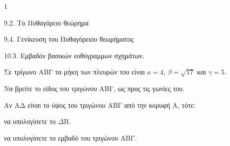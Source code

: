 \begin{ylh}{1}
    \item 9.2. Το Πυθαγόρειο θεώρημα
    \item 9.4. Γενίκευση του Πυθαγόρειου θεωρήματος
    \item 10.3. Εμβαδόν βασικών ευθύγραμμων σχημάτων.
\end{ylh}
Σε τρίγωνο ΑΒΓ τα μήκη των πλευρών του είναι $a=4$, $\beta=\sqrt{17}$ και $\gamma=5$.
\begin{alist}
    \item Να βρείτε το είδος του τριγώνου ΑΒΓ, ως προς τις γωνίες του. 
    \item Αν ΑΔ είναι το ύψος του τριγώνου ΑΒΓ από την κορυφή Α, τότε:
    \begin{rlist}
        \item να υπολογίσετε το $\Delta$B. 
        \item να υπολογίσετε το εμβαδό του τριγώνου ΑΒΓ. 
    \end{rlist}
\end{alist}